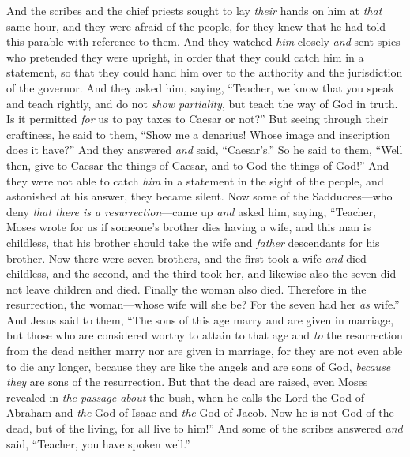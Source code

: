 \begin{biblechapter}
\verse And the scribes and the chief priests sought to lay \textit{their} hands on him at \textit{that} same hour, and they were afraid of the people, for they knew that he had told this parable with reference to them.
 And they watched \textit{him} closely \textit{and} sent spies who pretended they were upright, in order that they could catch him in a statement, so that they could hand him over to the authority and the jurisdiction of the governor.
\verse And they asked him, saying, “Teacher, we know that you speak and teach rightly, and do not \textit{show partiality}, but teach the way of God in truth.
\verse Is it permitted \textit{for} us to pay taxes to Caesar or not?”
\verse But seeing through their craftiness, he said to them,
\verse “Show me a denarius! Whose image and inscription does it have?” And they answered \textit{and} said, “Caesar’s.”
\verse So he said to them, “Well then, give to Caesar the things of Caesar, and to God the things of God!”
\verse And they were not able to catch \textit{him}﻿ in a statement in the sight of the people, and astonished at his answer, they became silent.
 Now some of the Sadducees—who deny \textit{that there is a resurrection}—came up \textit{and} asked him,
\verse saying, “Teacher, Moses wrote for us if someone’s brother dies having a wife, and this man is childless, that his brother should take the wife and \textit{father} descendants for his brother.
\verse Now there were seven brothers, and the first took a wife \textit{and} died childless,
\verse and the second,
\verse and the third took her, and likewise also the seven did not leave children and died.
\verse Finally the woman also died.
\verse Therefore in the resurrection, the woman—whose wife will she be? For the seven had her \textit{as} wife.”
\verse And Jesus said to them, “The sons of this age marry and are given in marriage,
\verse but those who are considered worthy to attain to that age and \textit{to} the resurrection from the dead neither marry nor are given in marriage,
\verse for they are not even able to die any longer, because they are like the angels and are sons of God, \textit{because they} are sons of the resurrection.
\verse But that the dead are raised, even Moses revealed in \textit{the passage about} the bush, when he calls the Lord the God of Abraham and \textit{the} God of Isaac and \textit{the} God of Jacob.
\verse Now he is not God of the dead, but of the living, for all live to him!”
\verse And some of the scribes answered \textit{and} said, “Teacher, you have spoken well.”

\end{biblechapter}
